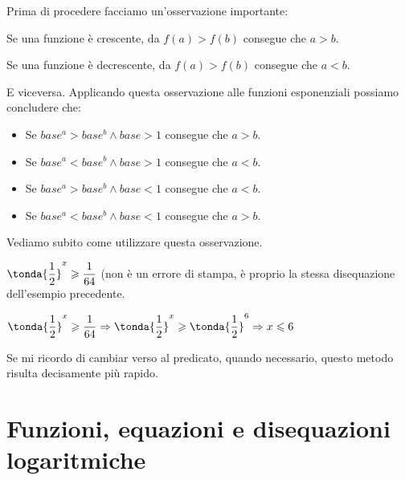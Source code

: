 Prima di procedere facciamo un'osservazione importante: 

Se una funzione è crescente, da \(f(a)>f(b)\) consegue che \(a>b\).

Se una funzione è decrescente, da \(f(a)>f(b)\) consegue che \(a<b\).

E viceversa. Applicando questa osservazione alle funzioni esponenziali possiamo 
concludere che:

\begin{itemize}
 \item Se \(base^a>base^b \wedge base>1\) consegue che \(a>b\).
 \item Se \(base^a<base^b \wedge base>1\) consegue che \(a<b\).
 \item Se \(base^a>base^b \wedge base<1\) consegue che \(a<b\).
 \item Se \(base^a<base^b \wedge base<1\) consegue che \(a>b\).
\end{itemize}

Vediamo subito come utilizzare questa osservazione.


\begin{esempio}
 \(\tonda{\dfrac{1}{2}}^x \geqslant \dfrac{1}{64}\) (non è un errore di stampa, 
è proprio la stessa disequazione dell'esempio precedente.
 
  \(\tonda{\dfrac{1}{2}}^x \geqslant \dfrac{1}{64} \Rightarrow
    \tonda{\dfrac{1}{2}}^x \geqslant \tonda{\dfrac{1}{2}}^6 \Rightarrow 
    x \leqslant 6\)
    
Se mi ricordo di cambiar verso al predicato, quando necessario, questo metodo 
risulta decisamente più rapido.
\end{esempio}


\section{Funzioni, equazioni e disequazioni logaritmiche}
\label{sec:esplog_logaritmiche}

















